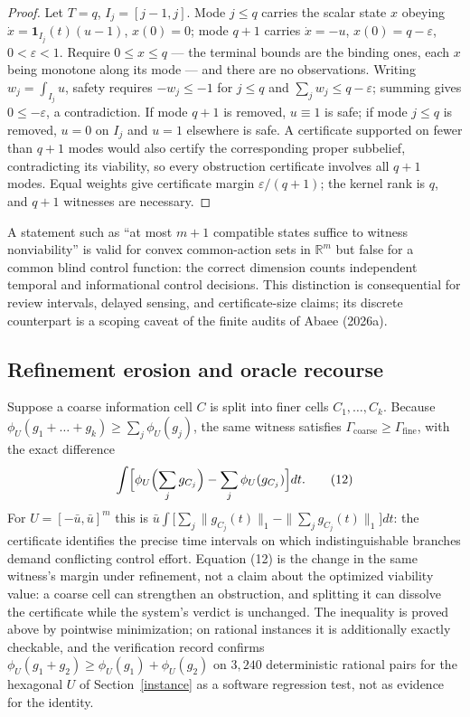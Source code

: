 \documentclass[10pt,twocolumn]{article}
\theoremstyle{plain}
\theoremstyle{definition}
\theoremstyle{remark}
\begin{document}
\begin{proof}
Let \(T = q\), \(I_j = [j-1, j]\). Mode \(j \le q\) carries the scalar state \(x\) obeying
\(\dot x = \mathbf{1}_{I_j}(t)(u - 1)\), \(x(0) = 0\); mode \(q+1\)
carries \(\dot x = -u\), \(x(0) = q - \varepsilon\), \(0 < \varepsilon
< 1\). Require \(0 \le x \le q\) --- the terminal bounds are the binding
ones, each \(x\) being monotone along its mode --- and there are no
observations. Writing
\(w_j = \int_{I_j} u\), safety requires \(-w_j \le -1\) for \(j \le q\) and
\(\sum_j w_j \le q - \varepsilon\); summing gives \(0 \le -\varepsilon\), a
contradiction. If mode \(q+1\) is removed, \(u \equiv 1\) is safe; if mode
\(j \le q\) is removed, \(u = 0\) on \(I_j\) and \(u = 1\) elsewhere is
safe. A certificate supported on fewer than \(q+1\) modes would also
certify the corresponding proper subbelief, contradicting its viability, so
every obstruction certificate involves all \(q+1\) modes. Equal weights give certificate margin \(\varepsilon/(q+1)\); the
kernel rank is \(q\), and \(q+1\) witnesses are necessary.
\end{proof}

A statement such as ``at most \(m+1\) compatible states suffice to witness
nonviability'' is valid for convex common-action sets in \(\mathbb{R}^m\) but
false for a common blind control function: the correct dimension counts
independent temporal and informational control decisions. This distinction
is consequential for review intervals, delayed sensing, and
certificate-size claims; its discrete counterpart is a scoping caveat of the
finite audits of Abaee (2026a).

\subsection{Refinement erosion and oracle recourse}\label{erosion}

Suppose a coarse information cell \(C\) is split into finer cells
\(C_1,\dots,C_k\). Because
\(\phi_U(g_1 + \dots + g_k) \ge \sum_j \phi_U(g_j)\), the same witness
satisfies \(\Gamma_{\mathrm{coarse}} \ge \Gamma_{\mathrm{fine}}\), with the
exact difference
\[
\int \Bigl[ \phi_U\Bigl(\sum_j g_{C_j}\Bigr) - \sum_j \phi_U(g_{C_j}) \Bigr]
dt.
\tag{12}
\]
For \(U = [-\bar u, \bar u]^m\) this is
\(\bar u \int \bigl[\sum_j \|g_{C_j}(t)\|_1 - \|\sum_j g_{C_j}(t)\|_1\bigr] dt\):
the certificate identifies the precise time intervals on which
indistinguishable branches demand conflicting control effort. Equation (12)
is the change in the same witness's margin under refinement, not a claim
about the optimized viability value: a coarse cell can strengthen an
obstruction, and splitting it can dissolve the certificate while the
system's verdict is unchanged. The inequality is proved above by pointwise minimization; on rational
instances it is additionally exactly checkable, and the verification record
confirms \(\phi_U(g_1 + g_2) \ge \phi_U(g_1) + \phi_U(g_2)\) on
\(3{,}240\) deterministic rational pairs for the hexagonal \(U\) of
Section~\ref{instance} as a software regression test, not as evidence for
the identity.
\end{document}
